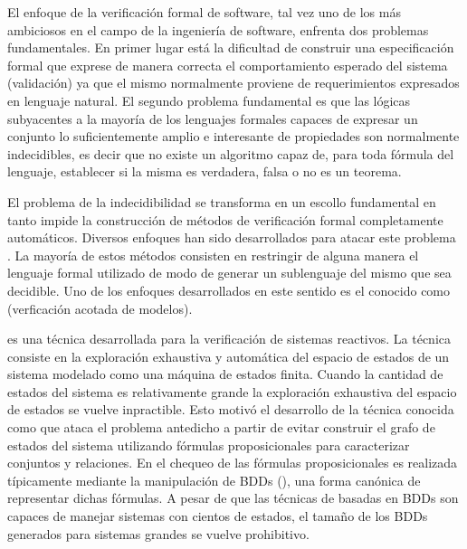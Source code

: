El enfoque de la verificación formal de software, tal vez uno de los más
ambiciosos en el campo de la ingeniería de software, enfrenta dos problemas
fundamentales. En primer lugar está la dificultad de construir una
especificación formal que exprese de manera correcta el comportamiento
esperado del sistema (validación) ya que el mismo normalmente proviene de
requerimientos expresados en lenguaje natural. El segundo problema fundamental
es que las lógicas subyacentes a la mayoría de los lenguajes formales capaces
de expresar un conjunto lo suficientemente amplio e interesante de propiedades
son normalmente indecidibles, es decir que no existe un algoritmo capaz de,
para toda fórmula del lenguaje, establecer si la misma es verdadera, falsa o
no es un teorema.

El problema de la indecidibilidad se transforma en un escollo fundamental en
tanto impide la construcción de métodos de verificación formal completamente
automáticos. Diversos enfoques han sido desarrollados para atacar este
problema . La mayoría
de estos métodos consisten en restringir de alguna manera el lenguaje formal
utilizado de modo de generar un sublenguaje del mismo que sea decidible. Uno
de los enfoques desarrollados en este sentido es el conocido como \bmc
(verficación acotada de modelos).

\mc\cite{emerson:scp-2_3} es una técnica desarrollada para la verificación de
sistemas reactivos. La técnica consiste en la exploración exhaustiva y
automática del espacio de estados de un sistema modelado como una máquina de
estados finita. Cuando la cantidad de estados del sistema es relativamente
grande la exploración exhaustiva del espacio de estados se vuelve inpractible.
Esto motivó el desarrollo de la técnica conocida como \smc\cite{burch:lics90,
mcmillan93} que ataca el problema antedicho a partir de evitar construir el
grafo de estados del sistema utilizando fórmulas proposicionales para
caracterizar conjuntos y relaciones. En \smc el chequeo de las fórmulas
proposicionales es realizada típicamente mediante la manipulación de BDDs
(\bdds), una forma canónica de representar dichas fórmulas. A pesar de que las
técnicas de \smc basadas en  BDDs son capaces de manejar sistemas con cientos
de estados, el tamaño de los BDDs generados para sistemas grandes se vuelve
prohibitivo.

